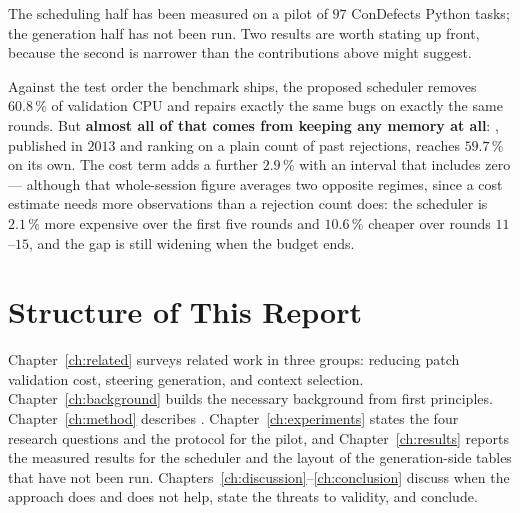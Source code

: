 The scheduling half has been measured on a pilot of $97$ ConDefects Python
tasks; the generation half has not been run. Two results are worth stating up
front, because the second is narrower than the contributions above might
suggest.

Against the test order the benchmark ships, the proposed scheduler removes
$60.8\,\%$ of validation CPU and repairs exactly the same bugs on exactly the
same rounds. But \textbf{almost all of that comes from keeping any memory at
all}: \frtp, published in $2013$ and ranking on a plain count of past
rejections, reaches $59.7\,\%$ on its own. The cost term adds a further
$2.9\,\%$ with an interval that includes zero --- although that whole-session
figure averages two opposite regimes, since a cost estimate needs more
observations than a rejection count does: the scheduler is $2.1\,\%$ more
expensive over the first five rounds and $10.6\,\%$ cheaper over rounds
$11$--$15$, and the gap is still widening when the budget ends.


\section{Structure of This Report}
\label{sec:intro-structure}

Chapter~\ref{ch:related} surveys related work in three groups: reducing patch
validation cost, steering generation, and context selection.
Chapter~\ref{ch:background} builds the necessary background from first
principles. Chapter~\ref{ch:method} describes \caster.
Chapter~\ref{ch:experiments} states the four research questions and the
protocol for the pilot, and Chapter~\ref{ch:results} reports the measured
results for the scheduler and the layout of the generation-side tables that
have not been run.
Chapters~\ref{ch:discussion}--\ref{ch:conclusion} discuss when the approach
does and does not help, state the threats to validity, and conclude.
